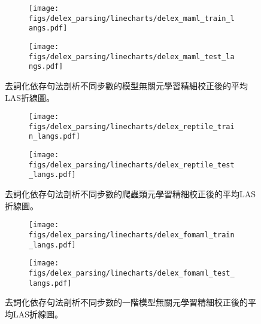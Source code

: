 \begin{figure}[htbp]
    \centering
    \begin{subfigure}[t]{\textwidth}
        \centering
        \texttt{[image: figs/delex\_parsing/linecharts/delex\_maml\_train\_langs.pdf]}
    \end{subfigure}
    \vspace{-12pt}
    \begin{subfigure}[t]{\textwidth}
        \centering
        \texttt{[image: figs/delex\_parsing/linecharts/delex\_maml\_test\_langs.pdf]}
    \end{subfigure}
    \caption{去詞化依存句法剖析不同步數的模型無關元學習精細校正後的平均LAS折線圖。}
    \label{fig:delex_avg_maml}
\end{figure}
\begin{figure}[htbp]
    \centering
    \begin{subfigure}[t]{\textwidth}
        \centering
        \texttt{[image: figs/delex\_parsing/linecharts/delex\_reptile\_train\_langs.pdf]}
    \end{subfigure}
    \vspace{-12pt}
    \begin{subfigure}[t]{\textwidth}
        \centering
        \texttt{[image: figs/delex\_parsing/linecharts/delex\_reptile\_test\_langs.pdf]}
    \end{subfigure}
    \caption{去詞化依存句法剖析不同步數的爬蟲類元學習精細校正後的平均LAS折線圖。}
    \label{fig:delex_avg_reptile}
\end{figure}
\begin{figure}[htbp]
    \centering
    \begin{subfigure}[t]{\textwidth}
        \centering
        \texttt{[image: figs/delex\_parsing/linecharts/delex\_fomaml\_train\_langs.pdf]}
    \end{subfigure}
    \vspace{-12pt}
    \begin{subfigure}[t]{\textwidth}
        \centering
        \texttt{[image: figs/delex\_parsing/linecharts/delex\_fomaml\_test\_langs.pdf]}
    \end{subfigure}
    \caption{去詞化依存句法剖析不同步數的一階模型無關元學習精細校正後的平均LAS折線圖。}
    \label{fig:delex_avg_fomaml}
\end{figure}
